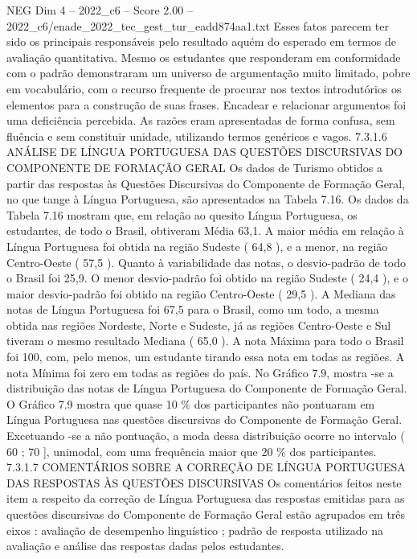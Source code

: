 \begin{textsample}{NEG Dim 4 – 2022\_c6 – Score 2.00 – 2022\_c6/enade\_2022\_tec\_gest\_tur\_eadd874aa1.txt}
Esses fatos parecem ter sido os principais responsáveis pelo resultado aquém do esperado em termos de avaliação quantitativa.
Mesmo os estudantes que responderam em conformidade com o padrão demonstraram um universo de argumentação muito limitado, pobre em vocabulário, com o recurso frequente de procurar nos textos introdutórios os elementos para a construção de suas frases.
Encadear e relacionar argumentos foi uma deficiência percebida.
As razões eram apresentadas de forma confusa, sem fluência e sem constituir unidade, utilizando termos genéricos e vagos. 7.3.1.6 ANÁLISE DE LÍNGUA PORTUGUESA DAS QUESTÕES DISCURSIVAS DO COMPONENTE DE FORMAÇÃO GERAL Os dados de Turismo obtidos a partir das respostas às Questões Discursivas do Componente de Formação Geral, no que tange à Língua Portuguesa, são apresentados na Tabela 7.16.
Os dados da Tabela 7.16 mostram que, em relação ao quesito Língua Portuguesa, os estudantes, de todo o Brasil, obtiveram Média 63,1.
A maior média em relação à Língua Portuguesa foi obtida na região Sudeste ( 64,8 ), e a menor, na região Centro-Oeste ( 57,5 ).
Quanto à variabilidade das notas, o desvio-padrão de todo o Brasil foi 25,9.
O menor desvio-padrão foi obtido na região Sudeste ( 24,4 ), e o maior desvio-padrão foi obtido na região Centro-Oeste ( 29,5 ).
A Mediana das notas de Língua Portuguesa foi 67,5 para o Brasil, como um todo, a mesma obtida nas regiões Nordeste, Norte e Sudeste, já as regiões Centro-Oeste e Sul tiveram o mesmo resultado Mediana ( 65,0 ).
A nota Máxima para todo o Brasil foi 100, com, pelo menos, um estudante tirando essa nota em todas as regiões.
A nota Mínima foi zero em todas as regiões do país.
No Gráfico 7.9, mostra -se a distribuição das notas de Língua Portuguesa do Componente de Formação Geral.
O Gráfico 7.9 mostra que quase 10 \% dos participantes não pontuaram em Língua Portuguesa nas questões discursivas do Componente de Formação Geral.
Excetuando -se a não pontuação, a moda dessa distribuição ocorre no intervalo ( 60 ; 70 ], unimodal, com uma frequência maior que 20 \% dos participantes. 7.3.1.7 COMENTÁRIOS SOBRE A CORREÇÃO DE LÍNGUA PORTUGUESA DAS RESPOSTAS ÀS QUESTÕES DISCURSIVAS Os comentários feitos neste item a respeito da correção de Língua Portuguesa das respostas emitidas para as questões discursivas do Componente de Formação Geral estão agrupados em três eixos : avaliação de desempenho linguístico ; padrão de resposta utilizado na avaliação e análise das respostas dadas pelos estudantes.

\end{textsample}
